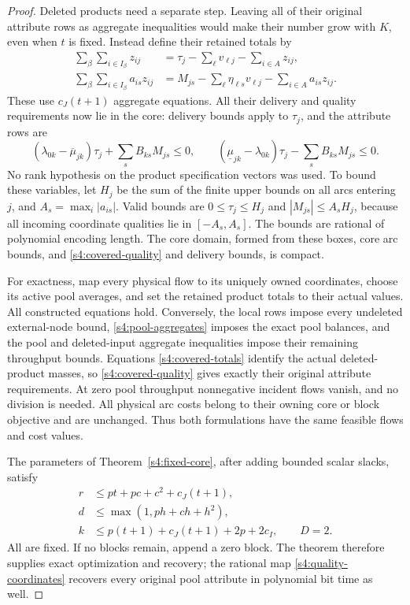 \begin{proof}
Deleted products need a separate step. Leaving all of their original
attribute rows as aggregate inequalities would make their number grow
with $K$, even when $t$ is fixed. Instead define their retained totals by
\begin{align}
 \sum_\beta\sum_{i\in I_\beta}z_{ij}
 &=\tau_j-\sum_\ell v_{\ell j}-\sum_{i\in A}z_{ij},\\
 \sum_\beta\sum_{i\in I_\beta}a_{is}z_{ij}
 &=M_{js}-\sum_\ell\eta_{\ell s}v_{\ell j}
                    -\sum_{i\in A}a_{is}z_{ij}.
 \label{s4:covered-totals}
\end{align}
These use $c_J(t+1)$ aggregate equations. All their delivery and quality
requirements now lie in the core: delivery bounds apply to $\tau_j$,
and the attribute rows are
\begin{equation}
 (\lambda_{0k}-\overline\mu_{jk})\tau_j+\sum_sB_{ks}M_{js}\le0,
 \qquad
 (\underline\mu_{jk}-\lambda_{0k})\tau_j-\sum_sB_{ks}M_{js}\le0.
 \label{s4:covered-quality}
\end{equation}
No rank hypothesis on the product specification vectors was used.
To bound these variables, let $H_j$ be the sum of the finite upper
bounds on all arcs entering $j$, and $A_s=\max_i|a_{is}|$. Valid bounds
are $0\le\tau_j\le H_j$ and $|M_{js}|\le A_sH_j$, because all incoming
coordinate qualities lie in $[-A_s,A_s]$. The bounds are rational of
polynomial encoding length. The core domain, formed from these boxes,
core arc bounds, and \eqref{s4:covered-quality} and delivery bounds,
is compact.

For exactness, map every physical flow to its uniquely owned
coordinates, choose its active pool averages, and set the retained
product totals to their actual values. All constructed equations hold.
Conversely, the local rows impose every undeleted external-node bound,
\eqref{s4:pool-aggregates} imposes the exact pool balances, and the
pool and deleted-input aggregate inequalities impose their remaining
throughput bounds. Equations \eqref{s4:covered-totals} identify the
actual deleted-product masses, so \eqref{s4:covered-quality} gives
exactly their original attribute requirements. At zero pool throughput
nonnegative incident flows vanish, and no division is needed. All
physical arc costs belong to their owning core or block objective and
are unchanged. Thus both formulations have the same feasible flows
and cost values.

The parameters of Theorem~\ref{s4:fixed-core}, after adding bounded
scalar slacks, satisfy
\begin{equation}
 \begin{aligned}
 r&\le pt+pc+c^2+c_J(t+1),\\
 d&\le\max(1,ph+ch+h^2),\\
 k&\le p(t+1)+c_J(t+1)+2p+2c_I,\qquad D=2.
 \end{aligned}\label{s4:structure-dimensions}
\end{equation}
All are fixed. If no blocks remain, append a zero block. The theorem
therefore supplies exact optimization and recovery; the rational map
\eqref{s4:quality-coordinates} recovers every original pool attribute
in polynomial bit time as well.
\end{proof}

